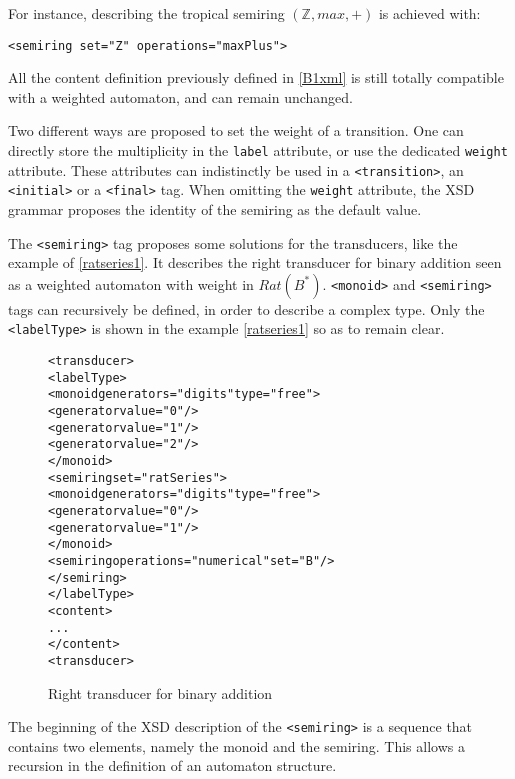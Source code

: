 \documentclass[a4paper]{article}
\newcommand{\xtag}[1]{\texttt{<#1>}}
\newcommand{\xattr}[1]{\texttt{#1}}
\def\typetag{\xtag{labelType}}
\def\dstname{\xattr{dst}}
\def\srcname{\xattr{src}}
\def\transitiontag{\xtag{transition}}
\def\finaltag{\xtag{final}}
\def\initialtag{\xtag{initial}}
\def\monoidtag{\xtag{monoid}}
\def\semiringtag{\xtag{semiring}}
\begin{document}
For instance, describing the tropical semiring $({\mathbb Z}, max, +)$
is achieved with:
\begin{center}
{\small
\verb|<semiring set="Z" operations="maxPlus">|}
\end{center}

All the content definition previously defined in \autoref{B1xml} is
still totally compatible with a weighted automaton, and can remain
unchanged.

Two different ways are proposed to set the weight of a transition. One
can directly store the multiplicity in the \verb|label| attribute, or
use the dedicated \verb|weight| attribute. These attributes can
indistinctly be used in a \transitiontag{}, an \initialtag{} or a
\finaltag{} tag. When omitting the \verb|weight| attribute, the XSD
grammar proposes the identity of the semiring as the default value.

\medskip

The \semiringtag{} tag proposes some solutions for the transducers,
like the example of \autoref{ratseries1}. It describes the right
transducer for binary addition seen as a weighted automaton with
weight in $Rat(B^*)$. \monoidtag{} and \semiringtag{} tags can
recursively be defined, in order to describe a complex type. Only the
\typetag{} is shown in the example \autoref{ratseries1} so as to
remain clear.

\begin{figure}[ht]
  \begin{center}
\begin{alltt}
<transducer>
  <labelType>
    <monoid generators="digits" type="free">
      <generator value="0"/>
      <generator value="1"/>
      <generator value="2"/>
    </monoid>
    <semiring set="ratSeries">
      <monoid generators="digits" type="free">
        <generator value="0"/>
        <generator value="1"/>
      </monoid>
      <semiring operations="numerical" set="B"/>
    </semiring>
  </labelType>
  <content>
    ...
  </content>
<transducer>
\end{alltt}
\caption{Right transducer for binary addition}
\label{ratseries1}
  \end{center}
\end{figure}

The beginning of the XSD description of the \semiringtag{} is a sequence that
contains two elements, namely the monoid and the semiring. This allows a
recursion in the definition of an automaton structure.

\end{document}
